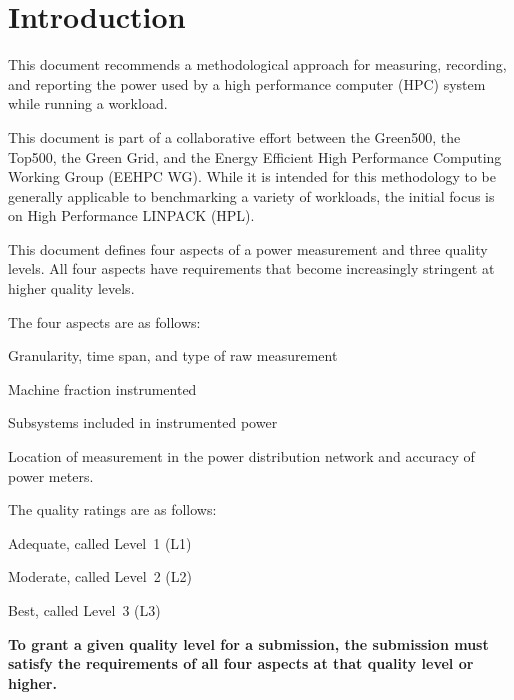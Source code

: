 \chapter{Introduction}
\label{sec:intro}

This document recommends a methodological approach for measuring, recording, and reporting the power used by a high performance computer (HPC) system while running a workload.

This document is part of a collaborative effort between the Green500, the Top500, the Green Grid, and the Energy Efficient High Performance Computing Working Group (EEHPC WG).
While it is intended for this methodology to be generally applicable to benchmarking a variety of workloads, the initial focus is on High Performance LINPACK (HPL).

This document defines four aspects of a power measurement and three quality levels.
All four aspects have requirements that become increasingly stringent at higher quality levels. 

The four aspects are as follows:

\begin{packed_enum}
\item 
Granularity, time span, and type of raw measurement
\item 
Machine fraction instrumented
\item 
Subsystems included in instrumented power
\item 
Location of measurement in the power distribution network and accuracy of power meters.
\end{packed_enum}

The quality ratings are as follows:

\begin{packed_item}
\item 
Adequate, called Level~1 (L1)
\item
Moderate, called Level~2 (L2)
\item
Best, called Level~3 (L3)
\end{packed_item}

\textbf{To grant a given quality level for a submission, the submission must
satisfy the requirements of all four aspects at that quality level
or higher.}
